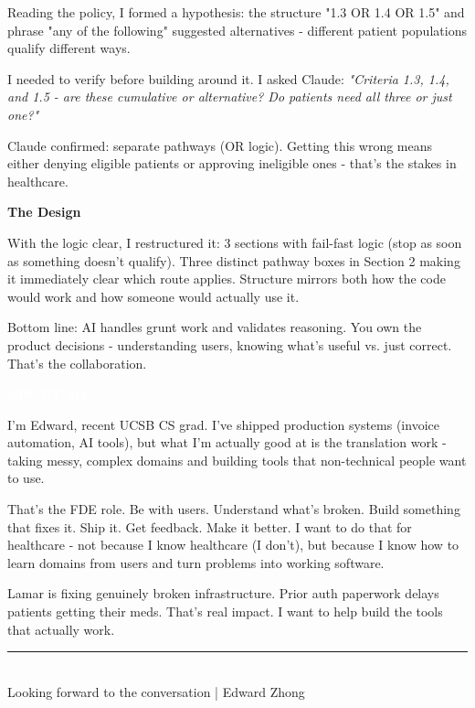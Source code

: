 \documentclass[11pt,letterpaper]{article}
\newcommand{\sectionbar}[1]{%
    \vspace{0.15cm}
    \noindent\colorbox{primaryblue}{%
        \parbox{\dimexpr\textwidth-2\fboxsep\relax}{%
            \textcolor{white}{\large\bfseries\sffamily #1}%
        }%
    }
    \vspace{0.2cm}
}
\begin{document}
Reading the policy, I formed a hypothesis: the structure "1.3 OR 1.4 OR 1.5" and phrase "any of the following" suggested alternatives - different patient populations qualify different ways.

I needed to verify before building around it. I asked Claude: \textit{"Criteria 1.3, 1.4, and 1.5 - are these cumulative or alternative? Do patients need all three or just one?"}

Claude confirmed: separate pathways (OR logic). Getting this wrong means either denying eligible patients or approving ineligible ones - that's the stakes in healthcare.

\textbf{The Design}

With the logic clear, I restructured it: 3 sections with fail-fast logic (stop as soon as something doesn't qualify). Three distinct pathway boxes in Section 2 making it immediately clear which route applies. Structure mirrors both how the code would work and how someone would actually use it.

Bottom line: AI handles grunt work and validates reasoning. You own the product decisions - understanding users, knowing what's useful vs. just correct. That's the collaboration.

\sectionbar{ABOUT ME}

I'm Edward, recent UCSB CS grad. I've shipped production systems (invoice automation, AI tools), but what I'm actually good at is the translation work - taking messy, complex domains and building tools that non-technical people want to use.

That's the FDE role. Be with users. Understand what's broken. Build something that fixes it. Ship it. Get feedback. Make it better. I want to do that for healthcare - not because I know healthcare (I don't), but because I know how to learn domains from users and turn problems into working software.

Lamar is fixing genuinely broken infrastructure. Prior auth paperwork delays patients getting their meds. That's real impact. I want to help build the tools that actually work.

\begin{center}
\rule{0.7\textwidth}{0.5pt}\\[0.15cm]
{\small\textcolor{textgray}{Looking forward to the conversation | Edward Zhong}}
\end{center}
\end{document}
